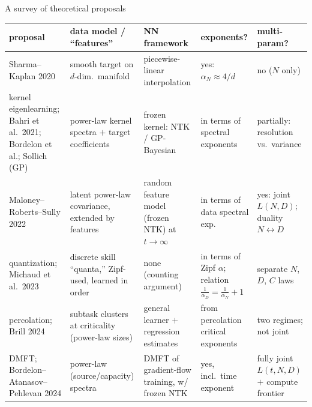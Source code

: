 \documentclass[11pt]{beamer}
\begin{document}
\begin{frame}{A survey of theoretical proposals}
  \begin{flushleft}
  \tiny
  \renewcommand{\arraystretch}{1.5}
  \setlength{\tabcolsep}{3pt}
  \begin{tabular}{>{\raggedright\arraybackslash}p{1.9cm}|>{\raggedright\arraybackslash}p{2.4cm}|>{\raggedright\arraybackslash}p{2.1cm}|>{\raggedright\arraybackslash}p{1.9cm}|>{\raggedright\arraybackslash}p{1.5cm}}
    \textbf{proposal} & \textbf{data model / ``features''} &
    \textbf{NN framework} & \textbf{exponents?} &
    \textbf{multi-param?} \\\hline
    Sharma--Kaplan 2020 & smooth target on $d$-dim.\ manifold &
    piecewise-linear interpolation & yes: $\alpha_N \approx 4/d$ & no
    ($N$ only) \\
    kernel eigenlearning; Bahri et al.\ 2021; Bordelon et al.; Sollich
    (GP) & power-law kernel spectra $+$ target coefficients & frozen
    kernel: NTK / GP-Bayesian & in terms of spectral exponents &
    partially: resolution vs.\ variance \\
    Maloney--Roberts--Sully 2022 & latent power-law covariance,
    extended by features & random feature model (frozen NTK) at $t\to\infty$ & in terms of data spectral exp. & yes: joint $L(N,D)$;
    duality $N \leftrightarrow D$ \\
    quantization; Michaud et al.\ 2023 & discrete skill ``quanta,''
    Zipf-used, learned in order & none (counting argument) & in terms of
    Zipf $\alpha$; relation $\frac{1}{\alpha_D} = \frac{1}{\alpha_N}+1$
    & separate $N$, $D$, $C$ laws \\
    percolation; Brill 2024 & subtask clusters at criticality
    (power-law sizes) & general learner $+$ regression estimates &
    from percolation critical exponents & two regimes; not joint \\
    DMFT; Bordelon--Atanasov--Pehlevan 2024 & power-law
    (source/capacity) spectra & DMFT of gradient-flow training, w/ frozen NTK & yes, incl.\ time exponent & fully joint $L(t,N,D)$ $+$
    compute frontier \\
  \end{tabular}
  \end{flushleft}
\end{frame}
\end{document}
